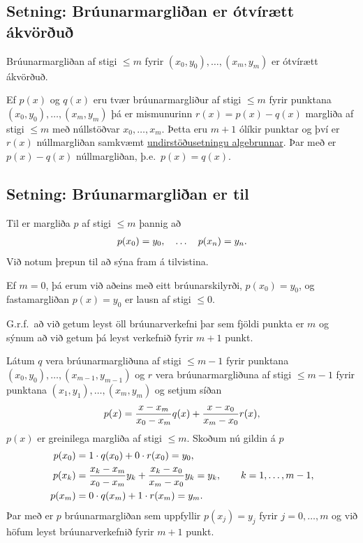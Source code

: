 \documentclass[letterpaper,10pt,icelandic]{sphinxmanual}
\begin{document}
\subsection{Setning: Brúunarmargliðan er ótvírætt ákvörðuð}
\label{kafli03:setning-bruunarmarglian-er-otviraett-akvoru}
Brúunarmargliðan af stigi \(\leq m\) fyrir \((x_0,y_0),\ldots,(x_m,y_m)\) er
ótvírætt ákvörðuð.

Ef \(p(x)\) og \(q(x)\) eru tvær
brúunarmargliður af stigi \(\leq m\) fyrir punktana
\((x_0,y_0), \ldots, (x_m,y_m)\) þá er mismunurinn
\(r(x) = p(x) - q(x)\) margliða af stigi \(\leq m\) með
núllstöðvar \(x_0, \ldots, x_m\). Þetta eru \(m+1\) ólíkir
punktar og því er \(r(x)\) núllmargliðan samkvæmt
\href{http://www.stae.is/fletta/undirst\%C3\%B6\%C3\%B0usetning/algebrunnar}{undirstöðusetningu algebrunnar}.
Þar með er \(p(x) - q(x)\) núllmargliðan, þ.e. \(p(x) = q(x)\).


\subsection{Setning: Brúunarmargliðan er til}
\label{kafli03:setning-bruunarmarglian-er-til}
Til er margliða \(p\) af stigi \(\leq m\) þannig að
\begin{gather}
\begin{split}p(x_0) = y_0, \quad \ldots \quad p(x_n)=y_n.\end{split}\notag
\end{gather}
Við notum þrepun til að sýna fram á tilvistina.

Ef \(m = 0\), þá erum við aðeins með eitt brúunarskilyrði,
\(p(x_0) = y_0\), og fastamargliðan \(p(x) = y_0\) er lausn af
stigi \(\leq 0\).

G.r.f. að við getum leyst öll brúunarverkefni þar sem fjöldi punkta er
\(m\) og sýnum að við getum þá leyst verkefnið fyrir \(m+1\)
punkt.

Látum \(q\) vera brúunarmargliðuna af stigi \(\leq m-1\) fyrir
punktana \((x_0,y_0), \ldots,
(x_{m-1},y_{m-1})\) og \(r\) vera brúunarmargliðuna af stigi
\(\leq m-1\) fyrir punktana \((x_1,y_1), \ldots, (x_m,y_m)\) og
setjum síðan
\begin{gather}
\begin{split}p(x) = \frac{x-x_m}{x_0-x_m}q(x) + \frac{x-x_0}{x_m-x_0}r(x),\end{split}\notag
\end{gather}
\(p(x)\) er greinilega margliða af stigi \(\leq m\). Skoðum nú
gildin á \(p\)
\begin{gather}
\begin{split}\begin{aligned}
  p(x_0) &= 1 \cdot q(x_0) + 0\cdot r(x_0) = y_0, \\
  p(x_k) &= \frac{x_k-x_m}{x_0-x_m}y_k
  + \frac{x_k-x_0}{x_m-x_0}y_k = y_k,\qquad k = 1, \ldots, m-1,\\
  p(x_m) &= 0 \cdot q(x_m) + 1 \cdot r(x_m) = y_m.\end{aligned}\end{split}\notag
\end{gather}
Þar með er \(p\) brúunarmargliðan sem uppfyllir \(p(x_j)=y_j\)
fyrir \(j=0,\dots,m\) og við höfum leyst brúunarverkefnið fyrir
\(m+1\) punkt.
\end{document}
